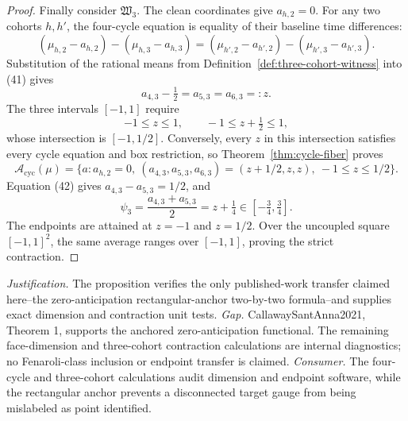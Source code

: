 \documentclass{article}
\begin{document}
\begin{proof}
Finally consider \(\mathfrak W_3\).  The clean coordinates give \(a_{h,2}=0\).  For any two cohorts \(h,h'\), the four-cycle equation is equality of their baseline time differences:
\[
 (\mu_{h,2}-a_{h,2})-(\mu_{h,3}-a_{h,3})
 = (\mu_{h',2}-a_{h',2})-(\mu_{h',3}-a_{h',3}).
\tag{41}
\]
Substitution of the rational means from Definition~\ref{def:three-cohort-witness} into (41) gives
\[
 a_{4,3}-\tfrac12=a_{5,3}=a_{6,3}=:z.
\tag{42}
\]
The three intervals \([-1,1]\) require
\[
 -1\le z\le1,
 \qquad
 -1\le z+\tfrac12\le1,
\]
whose intersection is \([-1,1/2]\).  Conversely, every \(z\) in this intersection satisfies every cycle equation and box restriction, so Theorem~\ref{thm:cycle-fiber} proves
\[
 \mathcal A_{\mathrm{cyc}}(\mu)
 =\{a:a_{h,2}=0,\ (a_{4,3},a_{5,3},a_{6,3})=(z+1/2,z,z),\ -1\le z\le1/2\}.
\tag{43}
\]
Equation (42) gives \(a_{4,3}-a_{5,3}=1/2\), and
\[
 \psi_3=\frac{a_{4,3}+a_{5,3}}{2}=z+\tfrac14
 \in[-\tfrac34,\tfrac34].
\tag{44}
\]
The endpoints are attained at \(z=-1\) and \(z=1/2\).  Over the uncoupled square \([-1,1]^2\), the same average ranges over \([-1,1]\), proving the strict contraction.
\end{proof}
\par\smallskip\noindent \textit{Justification.} The proposition verifies the only published-work transfer claimed here--the zero-anticipation rectangular-anchor two-by-two formula--and supplies exact dimension and contraction unit tests. \textit{Gap.} CallawaySantAnna2021, Theorem 1, supports the anchored zero-anticipation functional. The remaining face-dimension and three-cohort contraction calculations are internal diagnostics; no Fenaroli-class inclusion or endpoint transfer is claimed. \textit{Consumer.} The four-cycle and three-cohort calculations audit dimension and endpoint software, while the rectangular anchor prevents a disconnected target gauge from being mislabeled as point identified.
\end{document}
